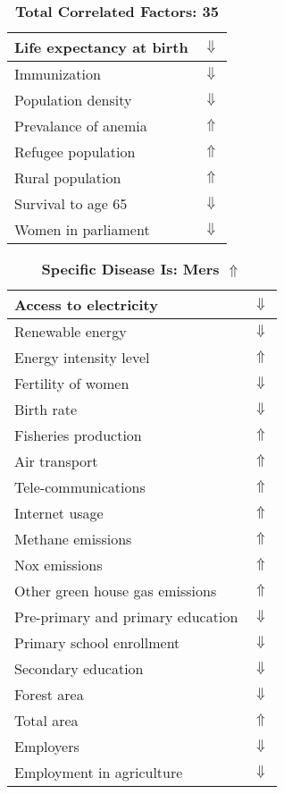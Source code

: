 \documentclass[12pt,notitlepage,oneside]{report}
\begin{document}
\begin{table}[!htb]
\begin{tabular}{|l|l|}
Life expectancy at birth & $\Downarrow$\\ \hline
Immunization & $\Downarrow$\\ \hline
Population density & $\Downarrow$\\ \hline
Prevalance of anemia & $\Uparrow$\\ \hline
Refugee population & $\Uparrow$\\ \hline
Rural population & $\Uparrow$\\ \hline
Survival to age 65 & $\Downarrow$\\ \hline
Women in parliament & $\Downarrow$\\ \hline
\end{tabular}
\caption*{\textbf{Total Correlated Factors: 35}}
\end{table}
\clearpage
\begin{table}[!htb]
\caption{\textbf{Specific Disease Is: Mers $\Uparrow$}}
\centering
\label{Correlated Socio-economic Factors0}
\begin{tabular}{|l|l|}
\hline
Access to electricity & $\Downarrow$\\ \hline
Renewable energy & $\Downarrow$\\ \hline
Energy intensity level & $\Uparrow$\\ \hline
Fertility of women & $\Downarrow$\\ \hline
Birth rate & $\Downarrow$\\ \hline
Fisheries production & $\Uparrow$\\ \hline
Air transport  & $\Uparrow$\\ \hline
Tele-communications & $\Uparrow$\\ \hline
Internet usage & $\Uparrow$\\ \hline
Methane emissions & $\Uparrow$\\ \hline
Nox emissions & $\Uparrow$\\ \hline
Other green house gas emissions & $\Uparrow$\\ \hline
Pre-primary and primary education & $\Downarrow$\\ \hline
Primary school enrollment & $\Downarrow$\\ \hline
Secondary education & $\Downarrow$\\ \hline
Forest area & $\Downarrow$\\ \hline
Total area & $\Uparrow$\\ \hline
Employers & $\Downarrow$\\ \hline
Employment in agriculture & $\Downarrow$\\ \hline

\end{tabular}
\end{table}
\end{document}
